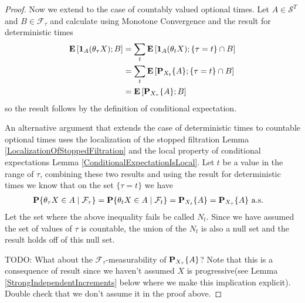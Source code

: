 \begin{proof}
Now we extend to the case of countably valued optional times.  Let $A
\in \mathcal{S}^T$ and $B \in \mathcal{F}_\tau$ and calculate using
Monotone Convergence and the result for deterministic times
\begin{align*}
\expectation{\characteristic{A}(\theta_\tau X) ; B} &= \sum_t
\expectation{\characteristic{A}(\theta_t X) ; \lbrace \tau = t \rbrace
  \cap B} \\
&= \sum_t \expectation{\sprobability{A}{X_t} ; \lbrace \tau = t \rbrace
  \cap B} \\
&= \expectation{\sprobability{A}{X_\tau} ; B} 
\end{align*}
so the result follows by the definition of conditional expectation. 

An alternative argument that extends the case of deterministic times
to countable optional times uses the localization of the stopped
filtration Lemma \ref{LocalizationOfStoppedFiltration} and the local
property of conditional expectations Lemma
\ref{ConditionalExpectationIsLocal}.  Let $t$ be a value in the range
of $\tau$, combining these two results and
using the result for deterministic times we
know that on the set $\lbrace \tau = t \rbrace$ we have
\begin{align*}
\cprobability{\mathcal{F}_{\tau}}{\theta_\tau X \in A} &=
\cprobability{\mathcal{F}_t}{\theta_t X \in A} = \sprobability{A}{X_t}
 = \sprobability{A}{X_\tau} \text{ a.s.}
\end{align*}
Let the set where the above inequality fails be called $N_t$.  Since
we have assumed the set of values of $\tau$ is countable, the union of
the $N_t$ is also a null set and the result holds off of this null
set.

TODO: What about the $\mathcal{F}_\tau$-measurability of
$\sprobability{A}{X_\tau}$?  Note that this is a consequence of result
since we haven't assumed $X$ is progressive(see Lemma
\ref{StrongIndependentIncrements} below where we make this implication explicit).  Double check that we
don't assume it in the proof above.
\end{proof}

